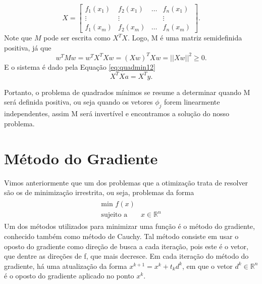 \documentclass[
	12pt,				%
    oneside,			%
	a4paper,			%
	english,			%
	french,				%
	spanish,			%
	brazil,				%
	]{abntex2}
\begin{document}
            \begin{equation*}
                X = \begin{bmatrix}
                f_{1}(x_1) & f_{2}(x_1) & \dots  & f_{n}(x_1) \\
                \vdots & \vdots &  & \vdots \\
                 f_{1}(x_m) & f_{2}(x_m) & \dots  & f_{n}(x_m)
                \end{bmatrix}.
            \end{equation*}
            Note que $M$ pode ser escrita como $X^{T}X$. Logo, M é uma matriz semidefinida positiva, já que
            \begin{equation*}\label{eq:quadmin13}
                w^{T}Mw = w^{T}X^{T}Xw = (Xw)^{T}Xw = ||Xw||^{2} \ge 0.
            \end{equation*}
            E o sistema é dado pela Equação \eqref{eq:quadmin12}
            \begin{equation}\label{eq:quadmin12}
                X^{T}Xa = X^{T}y.
            \end{equation}

            Portanto, o problema de quadrados mínimos se resume a determinar quando M será definida positiva, ou seja quando os vetores $\phi_j$ forem linearmente independentes, assim M será invertível e encontramos a solução do nosso problema.

    \section{Método do Gradiente}
        Vimos anteriormente que um dos problemas que a otimização trata de resolver são os de minimização irrestrita, ou seja, problemas da forma
        \begin{align*}
            \begin{split}
                \mbox{min } f(x) \\
                \mbox{sujeito a }& x \in \mathbb{R}^n
            \end{split}
        \end{align*}
        Um dos métodos utilizados para minimizar uma função é o método do gradiente, conhecido também como método de Cauchy. Tal método consiste em usar o oposto do gradiente como direção de busca a cada iteração, pois este é o vetor, que dentre as direções de f, que mais decresce. Em cada iteração do método do gradiente, há uma atualização da forma $x^{k+1} = x^k + t_kd^k$, em que o vetor $d^{k} \in \mathbb{R}^n$ é o oposto do gradiente aplicado no ponto $x^k$.
\end{document}
